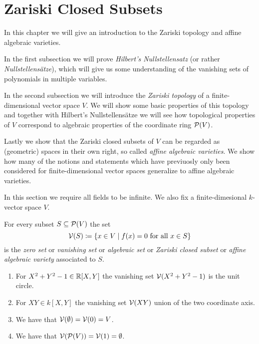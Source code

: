 \chapter{Zariski Closed Subsets}


\begin{fluff}
  In this chapter we will give an introduction to the Zariski topology and affine algebraic varieties.
  
  In the first subsection we will prove \emph{Hilbert’s Nullstellensatz} (or rather \emph{Nullstellensätze}), which will give us some understanding of the vanishing sets of polynomials in multiple variables.
  
  In the second subsection we will introduce the \emph{Zariski topology} of a finite-dimensional vector space $V$.
  We will show some basic properties of this topology and together with Hilbert’s Nullstellensätze we will see how topological properties of $V$ correspond to algebraic properties of the coordinate ring $\mathcal{P}(V)$.
  
  Lastly we show that the Zariski closed subsets of $V$ can be regarded as (geometric) spaces in their own right, so called \emph{affine algebraic varieties}.
  We show how many of the notions and statements which have previuosly only been considered for finite-dimensional vector spaces generalize to affine algebraic varieties.
\end{fluff}


\begin{conventions}
  In this section we require all fields to be infinite.
  We also fix a finite-dimesional $k$-vector space $V$.
\end{conventions}


\begin{definition}
  For every subset $S \subseteq \mathcal{P}(V)$ the set
  \[
              \mathcal{V}(S)
    \coloneqq \{
                x \in V
              \mid
                \text{$f(x) = 0$ for all $x \in S$}
              \}
  \]
  is the \emph{zero set} or \emph{vanishing set} or \emph{algebraic set} or \emph{Zariski closed subset} or \emph{affine algebraic variety} associated to $S$.
\end{definition}


\begin{example}
  \label{example: examples of algebraic subsets}
  \leavevmode
  \begin{enumerate}
    \item
      For $X^2 + Y^2 - 1 \in \mathbb{R}[X,Y]$ the vanishing set $\mathcal{V}(X^2 + Y^2 - 1)$ is the unit circle.
    \item
      For $XY \in k[X,Y]$ the vanishing set $\mathcal{V}(XY)$ union of the two coordinate axis.
    \item
      We have that $\mathcal{V}(\emptyset) = \mathcal{V}(0) = V$.
    \item
      We have that $\mathcal{V}(\mathcal{P}(V)) = \mathcal{V}(1) = \emptyset$.
  \end{enumerate}
\end{example}

